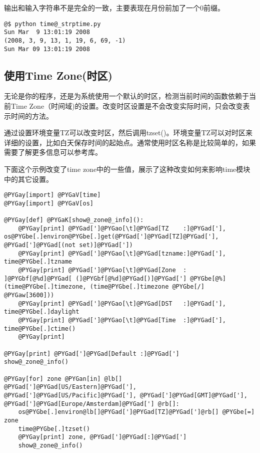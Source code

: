 \documentclass[a4paper,10pt,english]{manual}
\begin{document}
输出和输入字符串不是完全的一致，主要表现在月份前加了一个0前缀。

\begin{Verbatim}[commandchars=@\[\]]
@$ python time@_strptime.py
Sun Mar  9 13:01:19 2008
(2008, 3, 9, 13, 1, 19, 6, 69, -1)
Sun Mar 09 13:01:19 2008
\end{Verbatim}


\subsection{使用Time Zone(时区)}

无论是你的程序，还是为系统使用一个默认的时区，检测当前时间的函数依赖于当前Time Zone（时间域)的设置。改变时区设置是不会改变实际时间，只会改变表示时间的方法。

通过设置环境变量TZ可以改变时区，然后调用tzset()。环境变量TZ可以对时区来详细的设置，比如白天保存时间的起始点。通常使用时区名称是比较简单的，如果需要了解更多信息可以参考库。

下面这个示例改变了time zone中的一些值，展示了这种改变如何来影响time模块中的其它设置。

\begin{Verbatim}[commandchars=@\[\]]
@PYGay[import] @PYGaV[time]
@PYGay[import] @PYGaV[os]

@PYGay[def] @PYGaK[show@_zone@_info]():
    @PYGay[print] @PYGad[']@PYGao[\t]@PYGad[TZ    :]@PYGad['], os@PYGbe[.]environ@PYGbe[.]get(@PYGad[']@PYGad[TZ]@PYGad['], @PYGad[']@PYGad[(not set)]@PYGad['])
    @PYGay[print] @PYGad[']@PYGao[\t]@PYGad[tzname:]@PYGad['], time@PYGbe[.]tzname
    @PYGay[print] @PYGad[']@PYGao[\t]@PYGad[Zone  : ]@PYGbf[@%d]@PYGad[ (]@PYGbf[@%d]@PYGad[)]@PYGad['] @PYGbe[@%] (time@PYGbe[.]timezone, (time@PYGbe[.]timezone @PYGbe[/] @PYGaw[3600]))
    @PYGay[print] @PYGad[']@PYGao[\t]@PYGad[DST   :]@PYGad['], time@PYGbe[.]daylight
    @PYGay[print] @PYGad[']@PYGao[\t]@PYGad[Time  :]@PYGad['], time@PYGbe[.]ctime()
    @PYGay[print]

@PYGay[print] @PYGad[']@PYGad[Default :]@PYGad[']
show@_zone@_info()

@PYGay[for] zone @PYGan[in] @lb[] @PYGad[']@PYGad[US/Eastern]@PYGad['], @PYGad[']@PYGad[US/Pacific]@PYGad['], @PYGad[']@PYGad[GMT]@PYGad['], @PYGad[']@PYGad[Europe/Amsterdam]@PYGad['] @rb[]:
    os@PYGbe[.]environ@lb[]@PYGad[']@PYGad[TZ]@PYGad[']@rb[] @PYGbe[=] zone
    time@PYGbe[.]tzset()
    @PYGay[print] zone, @PYGad[']@PYGad[:]@PYGad[']
    show@_zone@_info()
\end{Verbatim}
\end{document}
